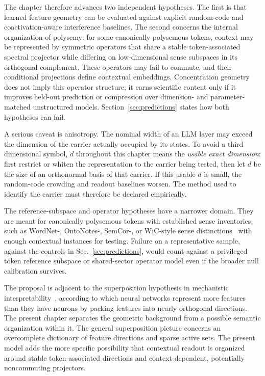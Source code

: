 \documentclass[
  aps,
  reprint,
  superscriptaddress,
  floatfix,
  nofootinbib,
  longbibliography
]{revtex4-2}
\begin{document}
The chapter therefore advances two independent hypotheses.  The first is that
learned feature geometry can be evaluated against explicit random-code and
coactivation-aware interference baselines.  The second concerns the internal
organization of polysemy: for some canonically polysemous tokens, context may
be represented by symmetric operators that share a stable token-associated
spectral projector while differing on low-dimensional sense subspaces in its
orthogonal complement.  These operators may fail to commute, and their
conditional projections define contextual embeddings.  Concentration
geometry does not imply this operator structure; it earns scientific content
only if it improves held-out prediction or compression over dimension- and
parameter-matched unstructured models.  Section~\ref{sec:predictions} states
how both hypotheses can fail.

A serious caveat is anisotropy.  The nominal width of an LLM layer may exceed
the dimension of the carrier actually occupied by its states.  To avoid a
third dimensional symbol, $d$ throughout this chapter means the \emph{usable
exact dimension}: first restrict or whiten the representation to the carrier
being tested, then let $d$ be the size of an orthonormal basis of that carrier.
If this usable $d$ is small, the random-code crowding and readout baselines
worsen.  The
method used to identify the carrier must therefore be declared empirically.

The reference-subspace and operator hypotheses have a narrower domain. They
are meant for
canonically polysemous tokens with established sense inventories, such
as WordNet-, OntoNotes-, SemCor-, or WiC-style sense
distinctions~\cite{pilehvar2019wic} with enough contextual instances
for testing. Failure on a representative sample, against the controls in
Sec.~\ref{sec:predictions}, would count against a privileged token reference
subspace or shared-sector operator model even if the broader null calibration
survives.

The proposal is adjacent to the superposition hypothesis in mechanistic
interpretability~\cite{elhage2022superposition}, according to which neural networks
represent more features than they have neurons by packing features into
nearly orthogonal directions. The present chapter separates the
geometric background from a possible semantic organization within it.
The general superposition picture concerns an overcomplete dictionary
of feature directions and sparse active sets. The present model adds the more
specific possibility that contextual readout is organized around stable
token-associated directions and context-dependent, potentially noncommuting
projectors.
\end{document}
